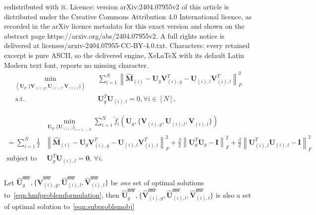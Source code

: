 \documentclass[10pt,a4paper]{amsart}
\newcommand{\hmatM}{\hat{\mathbf{M}}}
\newcommand{\hmatU}{\hat{\mathbf{U}}}
\newcommand{\hmatV}{\hat{\mathbf{V}}}
\def\hmf{\texttt{HMF}\xspace}
\newcommand{\matI}{\mathbf{I}}
\newcommand{\matU}{\mathbf{U}}
\newcommand{\matV}{\mathbf{V}}
\newcommand{\norm}[1]{\left\lVert#1\right\rVert}
\newcommand{\tf}{\tilde{f}}
\begin{document}
redistributed with it. Licence: version arXiv:2404.07955v2 of this article is distributed under the Creative Commons Attribution 4.0 International licence, as recorded in the arXiv licence metadata for this exact version and shown on the abstract page https://arxiv.org/abs/2404.07955v2. A full rights notice is delivered at licenses/arxiv-2404.07955-CC-BY-4.0.txt. Characters: every retained excerpt is pure ASCII, so the delivered engine, XeLaTeX with its default Latin Modern text font, reports no missing character.
\begin{equation}
\label{eqn:subproblemobj}
\begin{aligned}
\min_{\left(\matU_g,\{\matV_{(i),g},\matU_{(i),l},\matV_{(i),l}\}\right)} &\quad \sum_{i=1}^N\norm{\hmatM_{(i)}-\matU_g\matV_{(i),g}^T-\matU_{(i),l}\matV_{(i),l}^T}_F^2 \\
\text{s.t.}& \quad  \matU_g^T\matU_{(i),l}=0, \forall i\in [N],
\end{aligned}
\end{equation}

\begin{equation}
\label{eqn:hmfproblemformulation}
\begin{aligned}
&\min_{\matU_g,\{\matU_{(i),l}\}_{i=1,\cdots,N}} \sum_{i=1}^N\tf_i\left(\matU_g,\{\matV_{(i),g},\matU_{(i),l},\matV_{(i),l}\}\right)\\
=\sum_{i=1}^N\frac{1}{2}&\norm{\hmatM_{(i)}-\matU_g\matV_{(i),g}^T-\matU_{(i),l}\matV_{(i),l}^T}_F^2+\frac{\beta}{2}\norm{\matU_g^T\matU_g-\matI}_F^2+\frac{\beta}{2}\norm{\matU_{(i),l}^T\matU_{(i),l}-\matI}_F^2\\
\text{subject to  }&  
\,  \matU_g^T\matU_{(i),l}=\bm{0},\, \forall i . \\
\end{aligned}
\end{equation}

\begin{proposition}
Let $\hmatU_g^{\hmf},\{\hmatV^{\hmf}_{(i),g},\hmatU^{\hmf}_{(i),l},\hmatV^{\hmf}_{(i),l}\}$ be \textit{one} set of optimal solutions to~\eqref{eqn:hmfproblemformulation}, then $\hmatU_g^{\hmf},\{\hmatV^{\hmf}_{(i),g},\hmatU^{\hmf}_{(i),l},\hmatV^{\hmf}_{(i),l}\}$ is also a set of optimal solution to~\eqref{eqn:subproblemobj}
\end{proposition}
\end{document}
